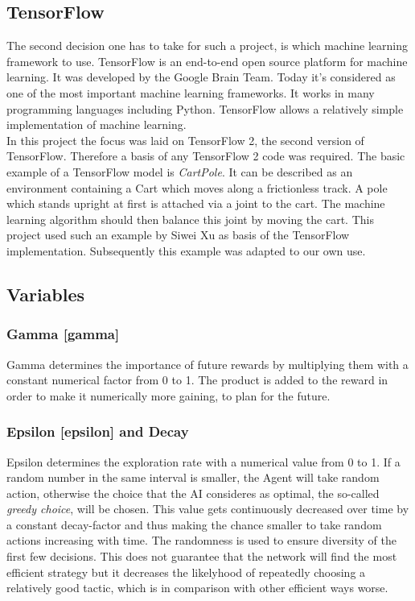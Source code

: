 \documentclass[12pt]{article}
\def\epsilon{epsilon}%
\def\gamma{gamma}%
\def\({}%
\def\){}%
\begin{document}
\subsection{TensorFlow}
The second decision one has to take for such a project, is which machine learning framework to use. TensorFlow is an end-to-end open source platform for machine learning. It was developed by the Google Brain Team. Today it's considered as one of the most important machine learning frameworks. It works in many programming languages including Python. TensorFlow allows a relatively simple implementation of machine learning. \cite{Tensorflow}\cite{TensorFlowWikipedia}\\
In this project the focus was laid on TensorFlow 2, the second version of TensorFlow. Therefore a basis of any TensorFlow 2 code was required. The basic example of a TensorFlow model is \textit{CartPole}. It can be described as an environment containing a Cart which moves along a frictionless track. A pole which stands upright at first is attached via a joint to the cart. The machine learning algorithm should then balance this joint by moving the cart. This project used such an example by Siwei Xu as basis of the TensorFlow implementation. Subsequently this example was adapted to our own use.
\cite{ourDqnModelBasis}
\subsection{Variables} \label{sec:variables}
\subsubsection{Gamma [\(\gamma\)]}
Gamma determines the importance of future rewards by multiplying them with a constant numerical factor from 0 to 1. The product is added to the reward in order to make it numerically more gaining, to plan for the future.

\subsubsection{Epsilon [\(\epsilon\)] and Decay}
Epsilon determines the exploration rate with a numerical value from 0 to 1. If a random number in the same interval is smaller, the Agent will take random action, otherwise the choice that the AI consideres as optimal, the so-called \textit{greedy choice}, will be chosen. This value gets continuously decreased over time by a constant decay-factor and thus making the chance smaller to take random actions increasing with time. The randomness is used to ensure diversity of the first few decisions. This does not guarantee that the network will find the most efficient strategy but it decreases the likelyhood of repeatedly choosing a relatively good tactic, which is in comparison with other efficient ways worse.
\end{document}
